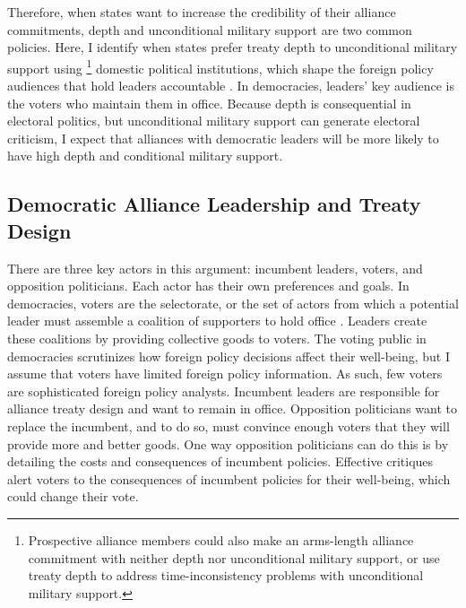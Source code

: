 \documentclass[12pt]{article}
\begin{document}
Therefore, when states want to increase the credibility of their alliance commitments, depth and unconditional military support are two common policies. 
Here, I identify when states prefer treaty depth to unconditional military support using \footnote{Prospective alliance members could also make an arms-length alliance commitment with neither depth nor unconditional military support, or use treaty depth to address time-inconsistency problems with unconditional military support.} domestic political institutions, which shape the foreign policy audiences that hold leaders accountable \citep{HydeSaunders2020}. 
In democracies, leaders' key audience is the voters who maintain them in office.  
Because depth is consequential in electoral politics, but unconditional military support can generate electoral criticism, I expect that alliances with democratic leaders will be more likely to have high depth and conditional military support. 



\subsection{Democratic Alliance Leadership and Treaty Design}


There are three key actors in this argument: incumbent leaders, voters, and opposition politicians. 
Each actor has their own preferences and goals. 
In democracies, voters are the selectorate, or the set of actors from which a potential leader must assemble a coalition of supporters to hold office \citep{BDMetal2002}. 
Leaders create these coalitions by providing collective goods to voters.
The voting public in democracies scrutinizes how foreign policy decisions affect their well-being, but I assume that voters have limited foreign policy information. 
As such, few voters are sophisticated foreign policy analysts. 
Incumbent leaders are responsible for alliance treaty design and want to remain in office.
Opposition politicians want to replace the incumbent, and to do so, must convince enough voters that they will provide more and better goods. 
One way opposition politicians can do this is by detailing the costs and consequences of incumbent policies.
Effective critiques alert voters to the consequences of incumbent policies for their well-being, which could change their vote. 
\end{document}
